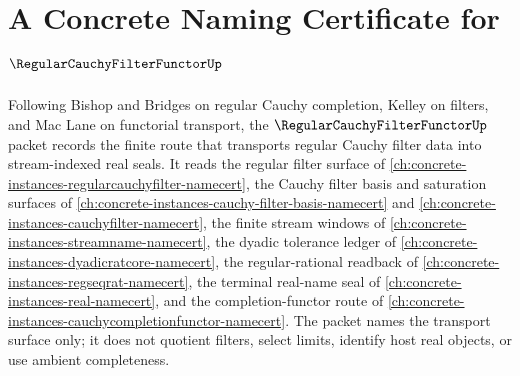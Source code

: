 \chapter{A Concrete Naming Certificate for $\RegularCauchyFilterFunctorUp$}
\label{ch:concrete-instances-regular-cauchy-filter-functor-namecert}

Following Bishop and Bridges on regular Cauchy completion, Kelley on filters, and Mac Lane on functorial transport, the $\RegularCauchyFilterFunctorUp$ packet records the finite route that transports regular Cauchy filter data into stream-indexed real seals. It reads the regular filter surface of \autoref{ch:concrete-instances-regularcauchyfilter-namecert}, the Cauchy filter basis and saturation surfaces of \autoref{ch:concrete-instances-cauchy-filter-basis-namecert} and \autoref{ch:concrete-instances-cauchyfilter-namecert}, the finite stream windows of \autoref{ch:concrete-instances-streamname-namecert}, the dyadic tolerance ledger of \autoref{ch:concrete-instances-dyadicratcore-namecert}, the regular-rational readback of \autoref{ch:concrete-instances-regseqrat-namecert}, the terminal real-name seal of \autoref{ch:concrete-instances-real-namecert}, and the completion-functor route of \autoref{ch:concrete-instances-cauchycompletionfunctor-namecert}. The packet names the transport surface only; it does not quotient filters, select limits, identify host real objects, or use ambient completeness.

